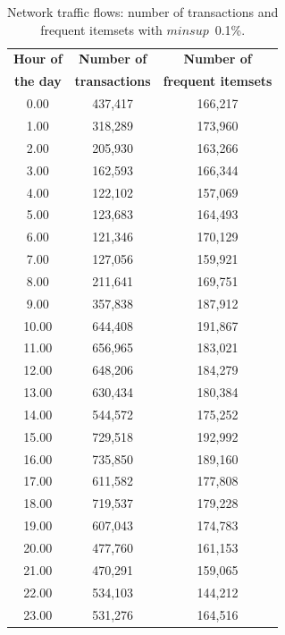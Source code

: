 \documentclass[preprint,review,12pt]{elsarticle}
\begin{document}
\begin{table}[h!]
\scriptsize
\begin{center}
\caption{Network traffic flows: number of transactions and frequent itemsets
with $minsup$~0.1\%.}
\label{netlog_itemsets}
\begin{tabular}{|c|c|c|}
\hline
{\bf Hour of}	& {\bf Number of} 	& {\bf	Number of} \\
{\bf the day}	& {\bf transactions} 	& {\bf	frequent itemsets} \\
\hline \hline
0.00  & 437,417 & 166,217 \\ \hline
1.00  & 318,289 & 173,960 \\ \hline
2.00  & 205,930 & 163,266 \\ \hline
3.00  & 162,593 & 166,344 \\ \hline
4.00  & 122,102 & 157,069 \\ \hline
5.00  & 123,683 & 164,493 \\ \hline
6.00  & 121,346 & 170,129 \\ \hline
7.00  & 127,056 & 159,921 \\ \hline
8.00  & 211,641 & 169,751 \\ \hline
9.00  & 357,838 & 187,912 \\ \hline
10.00 & 644,408 & 191,867 \\ \hline
11.00 & 656,965 & 183,021 \\ \hline
12.00 & 648,206 & 184,279 \\ \hline
13.00 & 630,434 & 180,384 \\ \hline
14.00 & 544,572 & 175,252 \\ \hline
15.00 & 729,518 & 192,992 \\ \hline
16.00 & 735,850 & 189,160 \\ \hline
17.00 & 611,582 & 177,808 \\ \hline
18.00 & 719,537 & 179,228 \\ \hline
19.00 & 607,043 & 174,783 \\ \hline
20.00 & 477,760 & 161,153 \\ \hline
21.00 & 470,291 & 159,065 \\ \hline
22.00 & 534,103 & 144,212 \\ \hline
23.00 & 531,276 & 164,516 \\ \hline
\end{tabular}
\end{center}
\end{table}
\end{document}
